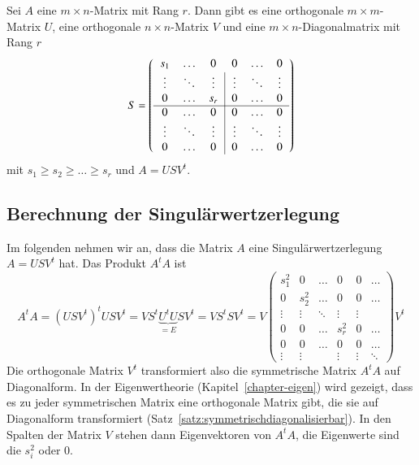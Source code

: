 \begin{satz}[Singulärwertzerlegung]\label{satz-svd}
Sei $A$ eine $m\times n$-Matrix mit Rang $r$.
Dann gibt es eine orthogonale $m\times m$-Matrix $U$, eine
orthogonale $n\times n$-Matrix $V$ und eine $m\times n$-Diagonalmatrix
mit Rang $r$ 
\begin{equation}
S=\left(
\begin{tabular}{>{$}c<{$}>{$}c<{$}>{$}c<{$}|>{$}c<{$}>{$}c<{$}>{$}c<{$}}
s_1   &\dots &0     &0     &\dots &0\\
\vdots&\ddots&\vdots&\vdots&\ddots&\vdots\\
0     &\dots &s_r   &0     &\dots &0\\
\hline
0     &\dots &0     &0     &\dots &0\\
\vdots&\ddots&\vdots&\vdots&\ddots&\vdots\\
0     &\dots &0     &0     &\dots &0\\
\end{tabular}
\right)
\label{s-matrix}
\end{equation}
mit $s_1\ge s_2\ge\dots \ge s_r$ und $A=USV^t$.
\end{satz}

\subsection{Berechnung der Singulärwertzerlegung
\label{subsection:berechnungdersingulaerwertzerleung}}
Im folgenden nehmen wir an, dass die Matrix $A$ eine Singulärwertzerlegung
$A=USV^t$ hat.
Das Produkt $A^tA$ ist
\[
A^tA
=
(USV^t)^tUSV^t
=
VS^t\underbrace{U^tU}_{=E}SV^t
=
VS^tSV^t
=
V
\begin{pmatrix}
s_1^2 &  0   & \dots &  0   &  0   &\dots\\
  0   &s_2^2 & \dots &  0   &  0   &\dots\\
\vdots&\vdots&\ddots &\vdots&\vdots&     \\
  0   &  0   & \dots & s_r^2&  0   &\dots\\
  0   &  0   & \dots &   0  &  0   &\dots\\
\vdots&\vdots&       &\vdots&\vdots&\ddots
\end{pmatrix}
V^t
\]
Die orthogonale Matrix $V^t$ transformiert also die symmetrische Matrix
$A^tA$ auf Diagonalform.
In der Eigenwertheorie (Kapitel~\ref{chapter-eigen}) wird gezeigt,
dass es zu jeder symmetrischen Matrix eine orthogonale Matrix
gibt, die sie auf Diagonalform transformiert
(Satz~\ref{satz:symmetrischdiagonalisierbar}).
In den Spalten der Matrix $V$ stehen dann Eigenvektoren von $A^tA$,
die Eigenwerte sind die $s_i^2$ oder $0$.

